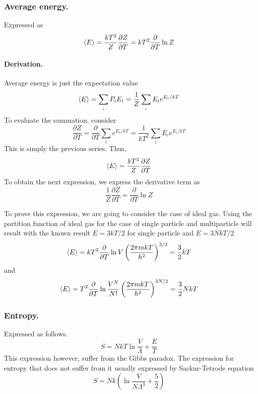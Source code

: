 \documentclass[../../../Main.tex]{subfiles}
\begin{document}
\subsubsection*{Average energy.} Expressed as
\begin{equation*}
    \braket{E}=\frac{kT^2}{Z}\frac{\partial Z}{\partial T}=kT^2\frac{\partial}{\partial T}\ln Z
\end{equation*}

\paragraph*{Derivation.} Average energy is just the expectation value
\begin{equation*}
    \braket{E}=\sum_{_i}P_iE_i=\frac{1}{Z}\sum_{_i}E_ie^{E_i/kT}
\end{equation*}
To evaluate the summation, consider
\begin{equation*}
    \frac{\partial Z}{\partial T}=\frac{\partial}{\partial T}\sum_i e^{E_i/kT}=\frac{1}{kT^2}\sum_i E_ie^{E_i/kT}
\end{equation*}
This is simply the previous series. Thus,
\begin{equation*}
    \braket{E}=\frac{kT^2}{Z}\frac{\partial Z}{\partial T}
\end{equation*}
To obtain the next expression, we express the derivative term as
\begin{equation*}
    \frac{1}{Z}\frac{\partial Z}{\partial T}=\frac{\partial }{\partial T}\ln Z
\end{equation*}

To prove this expression, we are going to consider the case of ideal gas. Using the partition function of ideal gas for the case of single particle and multiparticle will result with the known result $E=3kT/2$ for single particle and $E=3NkT/2$
\begin{equation*}
    \braket{E}=kT^2\frac{\partial}{\partial T}\ln V\left(\frac{2\pi mkT}{h^2}\right)^{3/2}=\frac{3}{2}kT
\end{equation*}
and 
\begin{equation*}
    \braket{E}=T^2\frac{\partial}{\partial T}\ln \frac{V^N}{N!}\left(\frac{2\pi mkT}{h^2}\right)^{3N/2}=\frac{3}{2}NkT
\end{equation*}

\subsubsection*{Entropy.} Expressed as follows.
\begin{equation*}
    S=NkT\ln \frac{V}{\Lambda}+\frac{E}{T}
\end{equation*}
This expression however, suffer from the Gibbs paradox. The expression for entropy that does not suffer from it usually expressed by Sackur-Tetrode equation
\begin{equation*}
    S=Nk\left(\ln\frac{V}{N\Lambda^3}+\frac{5}{2}\right)
\end{equation*}
\end{document}
